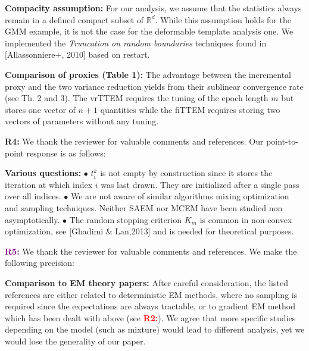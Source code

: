 \documentclass{article}
\begin{document}
\textbf{Compacity assumption:}  
For our analysis, we assume that the statistics always remain in a defined compact subset of $\mathbb{R}^d$.
While this assumption holds for the GMM example, it is not the case for the deformable template analysis one.
We implemented the \emph{Truncation on random boundaries} techniques found in [Allassonniere+, 2010] based on restart.

\textbf{Comparison of proxies (Table 1):} 
The advantage between the incremental proxy and the two variance reduction yields from their sublinear convergence rate (see Th. 2 and 3).
The vrTTEM requires the tuning of the epoch length $m$ but stores one vector of $n+1$ quantities while the fiTTEM requires storing two vectors of parameters without any tuning.\vspace{-0.05in}

\textbf{\textcolor{yellow!50!black}{R4:}} We thank the reviewer for valuable comments and references. Our point-to-point response is as follows:\vspace{-0.05in}

\textbf{Various questions:} $\bullet$ $t_i^k$ is not empty by construction since it stores the iteration at which index $i$ was last drawn. 
They are initialized after a single pass over all indices.
$\bullet$ We are not aware of similar algorithms mixing optimization and sampling techniques. 
Neither SAEM nor MCEM have been studied non asymptotically.
$\bullet$ The random stopping criterion $K_m$ is common in non-convex optimization, see [Ghadimi \& Lan,2013] and is needed for theoretical purposes.\vspace{-0.05in}


\textbf{\textcolor{purple}{R5:}} We thank the reviewer for valuable comments and references. We make the following precision:\vspace{-0.05in}

\textbf{Comparison to EM theory papers:}
After careful consideration, the listed references are either related to deterministic EM methods, where no sampling is required since the expectations are always tractable, or to gradient EM method which has been dealt with above (see \textbf{\textcolor{red}{R2:}}).
We agree that more specific studies depending on the model (such as mixture) would lead to different analysis, yet we would lose the generality of our paper.
\end{document}
